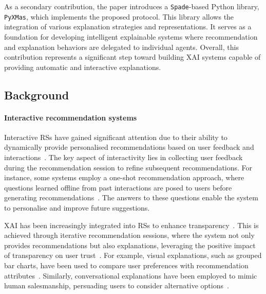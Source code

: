As a secondary contribution, the paper introduces a \texttt{Spade}-based Python library, \texttt{PyXMas}, which implements the proposed protocol.
%
This library allows the integration of various explanation strategies and representations.
%
It serves as a foundation for developing intelligent explainable systems where recommendation and explanation behaviors are delegated to individual agents.
%
Overall, this contribution represents a significant step toward building \gls{XAI} systems capable of providing automatic and interactive explanations.


\subsection{Background}\label{subsec:background-general-purpose-protocol-for-multi-agent-based-explanations}
%
\paragraph{Interactive recommendation systems}
%
Interactive \glspl{RS} have gained significant attention due to their ability to dynamically provide personalised recommendations based on user feedback and interactions~\cite{knijnenburg-2010}.
%
The key aspect of interactivity lies in collecting user feedback during the recommendation session to refine subsequent recommendations.
%
For instance, some systems employ a one-shot recommendation approach, where questions learned offline from past interactions are posed to users before generating recommendations~\cite{christakopoulou-2016}.
%
The answers to these questions enable the system to personalise and improve future suggestions.

\Gls{XAI} has been increasingly integrated into \glspl{RS} to enhance transparency~\cite{buzcu-prima-2022,zhang-2020}.
%
This is achieved through iterative recommendation sessions, where the system not only provides recommendations but also explanations, leveraging the positive impact of transparency on user trust~\cite{odonovan-2008}.
%
For example, visual explanations, such as grouped bar charts, have been used to compare user preferences with recommendation attributes~\cite{millecamp-2019}.
%
Similarly, conversational explanations have been employed to mimic human salesmanship, persuading users to consider alternative options~\cite{shimazu-2002}.


